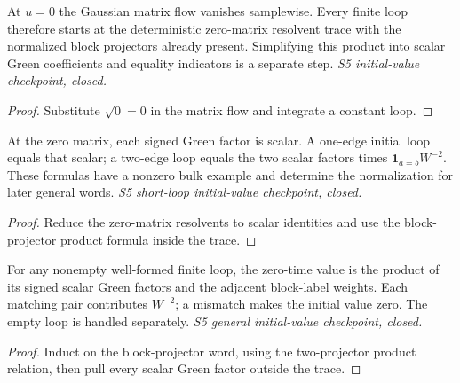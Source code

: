 \begin{lemma}
  \label{lem:loop-initial-value}
  \leanok
  At $u=0$ the Gaussian matrix flow vanishes samplewise. Every finite loop
  therefore starts at the deterministic zero-matrix resolvent trace with
  the normalized block projectors already present. Simplifying this product
  into scalar Green coefficients and equality indicators is a separate step.
  \emph{S5 initial-value checkpoint, closed.}
\end{lemma}
\begin{proof}\leanok
  Substitute $\sqrt0=0$ in the matrix flow and integrate a constant loop.
\end{proof}

\begin{lemma}
  \label{lem:loop-initial-scalar}
  \leanok
  At the zero matrix, each signed Green factor is scalar. A one-edge
  initial loop equals that scalar; a two-edge loop equals the two scalar
  factors times $\mathbf 1_{a=b}W^{-2}$. These formulas have a nonzero
  bulk example and determine the normalization for later general words.
  \emph{S5 short-loop initial-value checkpoint, closed.}
\end{lemma}
\begin{proof}\leanok
  Reduce the zero-matrix resolvents to scalar identities and use the
  block-projector product formula inside the trace.
\end{proof}

\begin{lemma}
  \label{lem:loop-initial-projection-words}
  \leanok
  For any nonempty well-formed finite loop, the zero-time value is the
  product of its signed scalar Green factors and the adjacent block-label
  weights. Each matching pair contributes $W^{-2}$; a mismatch makes the
  initial value zero. The empty loop is handled separately.
  \emph{S5 general initial-value checkpoint, closed.}
\end{lemma}
\begin{proof}\leanok
  Induct on the block-projector word, using the two-projector product
  relation, then pull every scalar Green factor outside the trace.
\end{proof}

